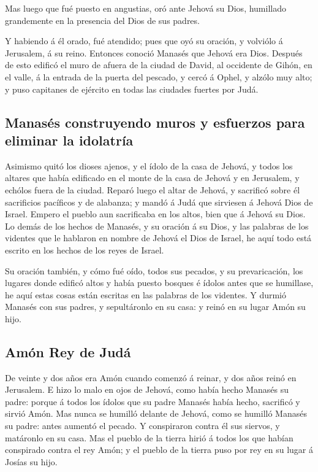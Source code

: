  Mas luego que fué puesto en angustias, oró ante Jehová su
Dios, humillado grandemente en la presencia del Dios de sus padres.

 Y habiendo á él orado, fué atendido; pues que oyó su
oración, y volviólo á Jerusalem, á su reino. Entonces conoció Manasés
que Jehová era Dios.  Después de esto edificó el muro de
afuera de la ciudad de David, al occidente de Gihón, en el valle, á la
entrada de la puerta del pescado, y cercó á Ophel, y alzólo muy alto; y
puso capitanes de ejército en todas las ciudades fuertes por Judá.

\hypertarget{manasuxe9s-construyendo-muros-y-esfuerzos-para-eliminar-la-idolatruxeda}{%
\subsection{Manasés construyendo muros y esfuerzos para eliminar la
idolatría}\label{manasuxe9s-construyendo-muros-y-esfuerzos-para-eliminar-la-idolatruxeda}}

 Asimismo quitó los dioses ajenos, y el ídolo de la casa de
Jehová, y todos los altares que había edificado en el monte de la casa
de Jehová y en Jerusalem, y echólos fuera de la ciudad. 
Reparó luego el altar de Jehová, y sacrificó sobre él sacrificios
pacíficos y de alabanza; y mandó á Judá que sirviesen á Jehová Dios de
Israel.  Empero el pueblo aun sacrificaba en los altos,
bien que á Jehová su Dios.  Lo demás de los hechos de
Manasés, y su oración á su Dios, y las palabras de los videntes que le
hablaron en nombre de Jehová el Dios de Israel, he aquí todo está
escrito en los hechos de los reyes de Israel.

 Su oración también, y cómo fué oído, todos sus pecados, y
su prevaricación, los lugares donde edificó altos y había puesto bosques
é ídolos antes que se humillase, he aquí estas cosas están escritas en
las palabras de los videntes.  Y durmió Manasés con sus
padres, y sepultáronlo en su casa: y reinó en su lugar Amón su hijo.

\hypertarget{amuxf3n-rey-de-juduxe1}{%
\subsection{Amón Rey de Judá}\label{amuxf3n-rey-de-juduxe1}}

 De veinte y dos años era Amón cuando comenzó á reinar, y
dos años reinó en Jerusalem.  E hizo lo malo en ojos de
Jehová, como había hecho Manasés su padre: porque á todos los ídolos que
su padre Manasés había hecho, sacrificó y sirvió Amón.  Mas
nunca se humilló delante de Jehová, como se humilló Manasés su padre:
antes aumentó el pecado.  Y conspiraron contra él sus
siervos, y matáronlo en su casa.  Mas el pueblo de la
tierra hirió á todos los que habían conspirado contra el rey Amón; y el
pueblo de la tierra puso por rey en su lugar á Josías su hijo.

